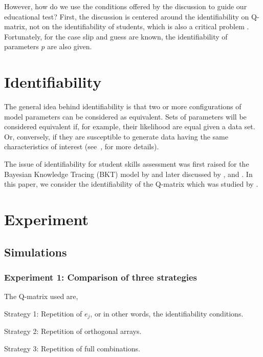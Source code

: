 \documentclass{edm_template}
\begin{document}
However, how do we use the conditions offered by the discussion to guide our educational test? First, the discussion is centered around the identifiability on Q-matrix, not on the identifiability of students, which is also a critical problem \cite{beck2007identifiability}. Fortunately, for the case slip and guess are known, the identifiability of parameters $p$ are also given. 
\section{Identifiability}

The general idea behind identifiability is that two or more configurations of model parameters can be considered as equivalent.  Sets of parameters will be considered equivalent if, for example, their likelihood are equal given a data set.  Or, conversely, if they are susceptible to generate data having the same characteristics of interest (see~, for more details).

The issue of identifiability for student skills assessment was first raised for the Bayesian Knowledge Tracing (BKT) model by  and later discussed by , and .  In this paper, we consider the identifiability of the Q-matrix which was studied by  .  

\section{Experiment}


\subsection{Simulations}


\subsubsection{Experiment 1: Comparison of three strategies}
   
The Q-matrix used are,

Strategy 1: Repetition of $e_j$, or in other words, the identifiability conditions.

Strategy 2: Repetition of orthogonal arrays.

Strategy 3: Repetition of full combinations.
\end{document}
